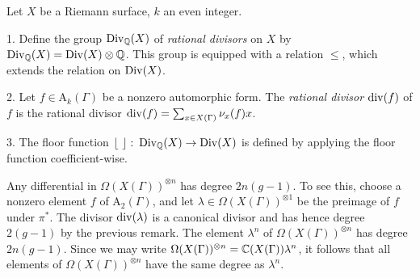 \begin{defi}
 Let $X$ be a Riemann surface, $k$ an even integer.
 
 1. Define the group $\operatorname{Div}_{\mathbb{Q}}(X)$ of \emph{rational divisors} on $X$ by $\operatorname{Div}_{\mathbb{Q}}(X)=\operatorname{Div}(X)\otimes\mathbb{Q}$. This group is equipped with a relation $\leq$, which extends the relation on $\operatorname{Div}(X)$.

 2. Let $f\in\mathrm{A}_k(\Gamma)$ be a nonzero automorphic form. The \emph{rational divisor} $\operatorname{div}(f)$ of $f$ is the rational divisor $\operatorname{div}(f)=\sum_{x\in X(\Gamma)}\nu_x(f)x$.
 
 3. The floor function $\floor{\ }\cl\Div_\Qbb(X)\to\Div(X)$ is defined by applying the floor function coefficient-wise.
\end{defi}

\begin{rmk} \label{pr:degree-diff}
 Any differential in $\Omega(X(\Gamma))^{\otimes n}$ has degree $2n(g-1)$. To see this, choose a nonzero element $f$ of $\mathrm{A}_2(\Gamma)$, and let $\lambda\in\Omega(X(\Gamma))^{\otimes 1}$ be the preimage of $f$ under $\pi^*$. The divisor $\operatorname{div}(\lambda)$ is a canonical divisor and has hence degree $2(g-1)$ by the previous remark. The element $\lambda^n$ of $\Omega(X(\Gamma))^{\otimes n}$ has degree $2n(g-1)$. Since we may write $\Omega(X(\Gamma))^{\otimes n}=\mathbb{C}(X(\Gamma))\lambda^{n}$, it follows that all elements of $\Omega(X(\Gamma))^{\otimes n}$ have the same degree as $\lambda^{n}$.
\end{rmk}

